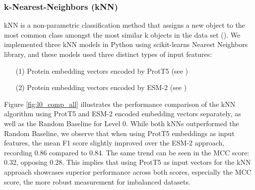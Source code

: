 \documentclass{bioinfo}
\begin{document}
\subsubsection{k-Nearest-Neighbors (kNN)}
kNN is a non-parametric classification method
that assigns a new object to the most common class amongst the most similar k objects in the data set (\cite{knn_principles}). We implemented three kNN models in Python using scikit-learns Nearest Neighbors library, and 
these models used three distinct types of input features:
\begin{enumerate}
	\item[(1)] Protein embedding vectors encoded by ProtT5 (see \cite{ProtT5})
    \item[(2)] Protein embedding vectors encoded by ESM-2 (see \cite{ESM2})
\end{enumerate}
Figure \ref{fig:l0_comp_all} illustrates the performance comparison of the kNN algorithm using ProtT5 and ESM-2 encoded
embedding vectors separately, as well as the Random Baseline for Level 0.
While both kNNs outperformed the Random Baseline, we observe that when using ProtT5 embeddings as input features, 
the mean F1 score slightly improved over the ESM-2 approach, recording 0.86 compared to 0.84.
The same trend can be seen in the MCC score: 0.32, opposing 0.28. 
This implies that using ProtT5 as input vectors for the kNN approach showcases superior performance across both scores, 
especially the MCC score, the more robust measurement for imbalanced datasets. 
\end{document}
